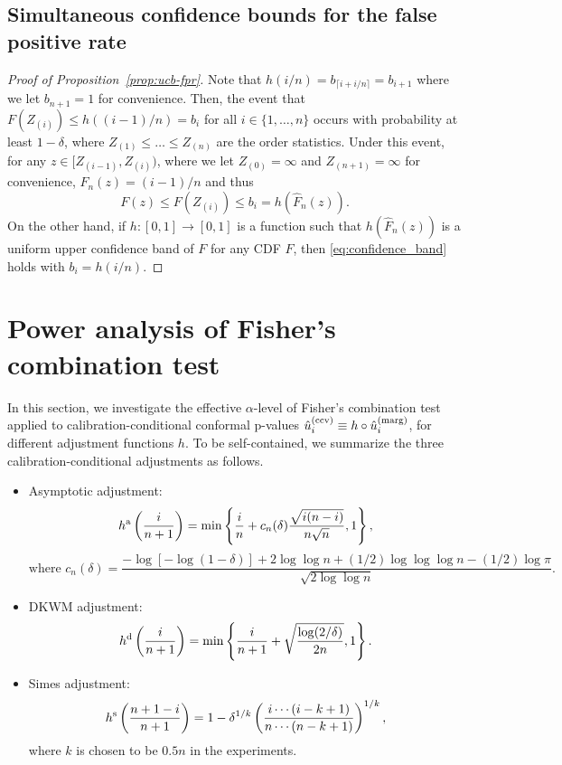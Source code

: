\documentclass[11pt]{article}
\def\marg{\textnormal{(marg)}}
\def\cond{\textnormal{(ccv)}}
\def\dkwm{\textnormal{d}}
\def\simes{\textnormal{s}}
\def\asym{\textnormal{a}}
\newcommand{\lb}{\left(}
\newcommand{\rb}{\right)}
\begin{document}
\subsection{Simultaneous confidence bounds for the false positive rate}

\begin{proof}[Proof of Proposition~\ref{prop:ucb-fpr}]
Note that $h(i / n) = b_{\lceil i + i/n\rceil} = b_{i+1}$ where we let $b_{n+1} = 1$ for  convenience. Then, the event that $F(Z_{(i)})\le h((i - 1) / n) = b_{i}$ for all $i \in \{1, \ldots, n\}$ occurs with probability at least $1 - \delta$, where $Z_{(1)}\le \ldots\le Z_{(n)}$ are the order statistics. Under this event, for any $z \in [Z_{(i-1)}, Z_{(i)})$, where we let $Z_{(0)} = \infty$ and $Z_{(n+1)} = \infty$ for convenience, $\hat{F}_{n}(z) = (i - 1) / n$ and thus
\[F(z)\le F(Z_{(i)})\le b_{i} = h\left(\hat{F}_{n}(z)\right).\]
On the other hand, if $h: [0, 1]\rightarrow [0, 1]$ is a function such that $h(\hat{F}_{n}(z))$ is a uniform upper confidence band of $F$ for any CDF $F$, then \eqref{eq:confidence_band} holds with $b_{i} = h(i / n)$.
\end{proof}


\section{Power analysis of Fisher's combination test}\label{sec:power_fisher}

In this section, we investigate the effective $\alpha$-level of Fisher's combination test applied to calibration-conditional conformal p-values $\hat{u}_i^\cond \equiv h\circ \hat{u}_i^\marg$, for different adjustment functions $h$. To be self-contained, we summarize the three calibration-conditional adjustments as follows.
\begin{itemize}
\item Asymptotic adjustment:
  \begin{equation}
    \label{eq:asym}
    h^\asym\lb \frac{i}{n+1}\rb = \min\left\{\frac{i}{n} + c_n(\delta)\frac{\sqrt{i(n - i)}}{n\sqrt{n}}, 1\right\}, 
  \end{equation}
  \[\text{where } c_n(\delta) = \frac{-\log[-\log(1-\delta)]+2\log\log n + (1/2) \log \log \log n - (1/2) \log\pi }{\sqrt{2 \log \log n}}.\]
\item DKWM adjustment:
  \[h^\dkwm\lb \frac{i}{n+1}\rb = \min\left\{\frac{i}{n+1} + \sqrt{\frac{\log(2/\delta)}{2n}}, 1\right\}.\]
\item Simes adjustment:
  \[h^\simes\lb \frac{n+1 - i}{n+1}\rb = 1 - \delta^{1/k}\left(\frac{i\cdots (i - k + 1)}{n\cdots (n - k + 1)}\right)^{1/k},\]
  where $k$ is chosen to be $0.5 n$ in the experiments.
\end{itemize}
\end{document}
